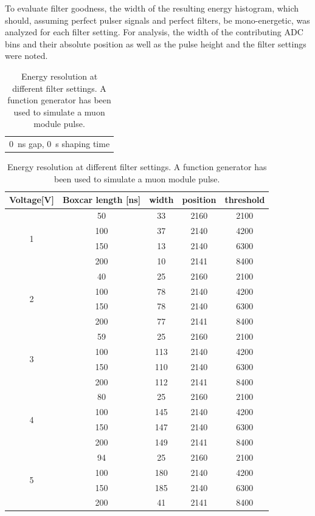   To evaluate filter goodness, the width of the resulting energy histogram, which should, assuming perfect pulser signals and perfect filters, be mono-energetic, was analyzed for each filter setting. For analysis, the width of the contributing ADC bins and their absolute position as well as the pulse height and the filter settings were noted. 
  
  \begin{table}
	\begin{tabular}{c}
	\SI{0}{\nano\second} gap, \SI{0}{\second} shaping time\\
	\end{tabular}
  	\begin{tabular}{|c|c|c|c|c|}
  		\hline
  		Voltage[V] & Boxcar length [ns] & width & position & threshold\\
  		\hline
  		\multirow{4}{*}{1} & 50 & 33 & 2160 & 2100\\
  		 & 100 & 37 & 2140 & 4200\\
  		 & 150 & 13 & 2140 & 6300\\
  		 & 200 & 10 & 2141 & 8400\\
  		 \hline
  		 \multirow{4}{*}{2} & 40 & 25 & 2160 & 2100\\
  		 & 100 & 78 & 2140 & 4200\\
  		 & 150 & 78 & 2140 & 6300\\
  		 & 200 & 77 & 2141 & 8400\\
  		 \hline
  		 \multirow{4}{*}{3} & 59 & 25 & 2160 & 2100\\
  		 & 100 & 113 & 2140 & 4200\\
  		 & 150 & 110 & 2140 & 6300\\
  		 & 200 & 112 & 2141 & 8400\\
  		 \hline
  		 \multirow{4}{*}{4} & 80 & 25 & 2160 & 2100\\
  		 & 100 & 145 & 2140 & 4200\\
  		 & 150 & 147 & 2140 & 6300\\
  		 & 200 & 149 & 2141 & 8400\\
  		 \hline
  		 \multirow{4}{*}{5} & 94 & 25 & 2160 & 2100\\
  		 & 100 & 180 & 2140 & 4200\\
  		 & 150 & 185 & 2140 & 6300\\
  		 & 200 & 41 & 2141 & 8400\\
  		 \hline	
  	\end{tabular}
  \caption[Energy resolution dependant on filter setting]{Energy resolution at different filter settings. A function generator has been used to simulate a muon module pulse.}
	\centering
  \end{table}
  
